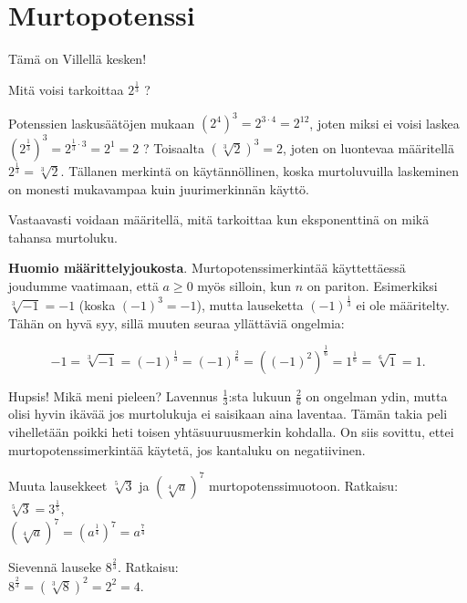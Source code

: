 \chapter{Murtopotenssi}

Tämä on Villellä kesken!

Mitä voisi tarkoittaa $2^\frac{1}{3}$ ?

Potenssien laskusäätöjen mukaan $(2^4)^3 = 2^{3\cdot 4} = 2^{12}$, joten miksi ei voisi laskea $\left( 2^{\frac{1}{3}}\right)^3 = 2^{\frac{1}{3}\cdot 3} = 2^1=2$ ? Toisaalta $(\sqrt[3]{2})^3=2$, joten on luontevaa määritellä $2^{\frac{1}{3}} = \sqrt[3]{2}$. Tällanen merkintä on käytännöllinen, koska murtoluvuilla laskeminen on monesti mukavampaa kuin juurimerkinnän käyttö.


Vastaavasti voidaan määritellä, mitä tarkoittaa kun eksponenttinä on mikä tahansa murtoluku.


{\bf Huomio määrittelyjoukosta}. Murtopotenssimerkintää käyttettäessä joudumme vaatimaan, että $a\geq 0$ myös silloin, kun $n$ on pariton. Esimerkiksi $\sqrt[3]{-1}=-1$ (koska $(-1)^3=-1$), mutta lauseketta $(-1)^\frac{1}{3}$ ei ole määritelty. Tähän on hyvä syy, sillä muuten seuraa yllättäviä ongelmia:

\[ -1 = \sqrt[3]{-1} = (-1)^\frac{1}{3} = (-1)^\frac{2}{6}
= ((-1)^2)^\frac{1}{6} = 1^\frac{1}{6} = \sqrt[6]{1} = 1. \]

Hupsis! Mikä meni pieleen? Lavennus $\frac{1}{3}$:sta lukuun $\frac{2}{6}$ on ongelman ydin, mutta olisi hyvin ikävää jos murtolukuja ei saisikaan aina laventaa. Tämän takia peli vihelletään poikki
heti toisen yhtäsuuruusmerkin kohdalla. On siis sovittu, ettei
murtopotenssimerkintää käytetä, jos kantaluku on negatiivinen.

\begin{esimerkki}
Muuta lausekkeet $\sqrt[5]{3}$ ja $(\sqrt[4]{a})^7$ murtopotenssimuotoon. Ratkaisu: \\
$\sqrt[5]{3} = 3^\frac{1}{5}$, \\
$(\sqrt[4]{a})^7 = (a^\frac{1}{4})^7=a^\frac{7}{4}$
\end{esimerkki}

\begin{esimerkki}
Sievennä lauseke $8^\frac{2}{3}$. Ratkaisu: \\
 $8^\frac{2}{3} = (\sqrt[3]{8})^2 = 2^2 = 4.$
\end{esimerkki}

